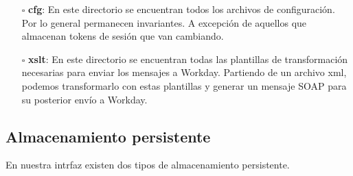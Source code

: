 \begin{itemize}
	\item[$\square$] \textbf{cfg}: En este directorio se encuentran todos los archivos de configuración. 
	Por lo general permanecen invariantes. A excepción de aquellos que almacenan tokens de sesión que van cambiando.
	\item[$\square$] \textbf{xslt}: En este directorio se encuentran todas las plantillas de transformación necesarias para enviar los mensajes a Workday.
	Partiendo de un archivo xml, podemos transformarlo con estas plantillas y generar un mensaje SOAP para su posterior envío a Workday.
	

\end{itemize}







\subsection{Almacenamiento persistente}

En nuestra intrfaz existen dos tipos de almacenamiento persistente. 

